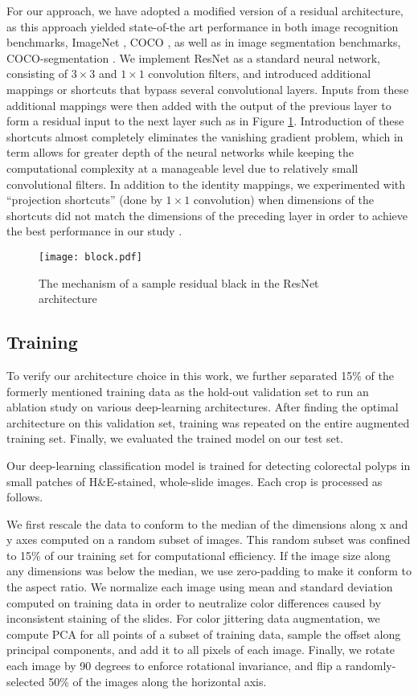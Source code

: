 \documentclass[review]{elsarticle}
\begin{document}
For our approach, we have adopted a modified version of a residual architecture, as this approach yielded state-of-the art performance in both image recognition benchmarks, ImageNet \citep{russakovsky2015imagenet}, COCO \citep{tsung2014coco}, as well as in image segmentation benchmarks, COCO-segmentation \citep{tsung2014coco}. We implement ResNet as a standard neural network, consisting of $3\times 3$ and $1 \times 1$ convolution filters, and introduced additional mappings or shortcuts that bypass several convolutional layers. Inputs from these additional mappings were then added with the output of the previous layer to form a residual input to the next layer such as in Figure \ref{fig:block}. Introduction of these shortcuts almost completely eliminates the vanishing gradient problem, which in term allows for greater depth of the neural networks while keeping the computational complexity at a manageable level due to relatively small convolutional filters. In addition to the identity mappings, we experimented with “projection shortcuts” (done by $1\times 1$ convolution) when dimensions of the shortcuts did not match the dimensions of the preceding layer in order to achieve the best performance in our study \citep{he2015deep}.

\begin{figure}[h!]
\centering
\texttt{[image: block.pdf]}
\caption{The mechanism of a sample residual black in the ResNet architecture \citep{he2015deep}}
\label{fig:block}
\end{figure}\subsection{Training}\label{training}
To verify our architecture choice in this work, we further separated 15\% of the formerly mentioned training data as the hold-out validation set to run an ablation study on various deep-learning architectures. After finding the optimal architecture on this validation set, training was repeated on the entire augmented training set. Finally, we evaluated the trained model on our test set. 

Our deep-learning classification model is trained for detecting colorectal polyps in small patches of H\&E-stained, whole-slide images. Each crop is processed as follows.

We first rescale the data to conform to the median of the dimensions along x and y axes computed on a random subset of images. This random subset was confined to 15\% of our training set for computational efficiency. If the image size along any dimensions was below the median, we use zero-padding to make it conform to the aspect ratio. We normalize each image using mean and standard deviation computed on training data in order to neutralize color differences caused by inconsistent staining of the slides. For color jittering data augmentation, we compute PCA for all points of a subset of training data, sample the offset along principal components, and add it to all pixels of each image. Finally, we rotate each image by 90 degrees to enforce rotational invariance, and flip a randomly-selected 50\% of the images along the horizontal axis.
\end{document}
